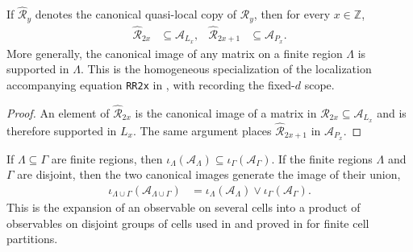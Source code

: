 \begin{lemma}
    \label{thm:qca_site_indexed_support_regions}
    \leanok
    If $\widehat{\mathcal R}_y$ denotes the canonical quasi-local copy of
    $\mathcal R_y$, then for every $x\in\mathbb Z$,
    \begin{align}
        \widehat{\mathcal R}_{2x}   & \subseteq\mathcal A_{L_x}, &
        \widehat{\mathcal R}_{2x+1} & \subseteq\mathcal A_{P_x}.
    \end{align}
    More generally, the canonical image of any matrix on a finite region
    $\Lambda$ is supported in $\Lambda$.
    This is the homogeneous specialization of the localization accompanying
    equation \texttt{RR2x} in \cite[lines~1261--1274]{Gross2012IndexTheory}, with \cite{gap:gnvw12_site_dependent_adjacent_generation_scope} recording the
    fixed-$d$
    scope.
\end{lemma}

\begin{proof}\leanok
    An element of $\widehat{\mathcal R}_{2x}$ is the canonical image of a
    matrix in $\mathcal R_{2x}\subseteq\mathcal A_{L_x}$ and is therefore
    supported in $L_x$.  The same argument places
    $\widehat{\mathcal R}_{2x+1}$ in $\mathcal A_{P_x}$.
\end{proof}

\begin{lemma}
    \label{thm:qca_disjoint_region_generation}
    \leanok
    If $\Lambda\subseteq\Gamma$ are finite regions, then
    $\iota_\Lambda(\mathcal A_\Lambda)
        \subseteq\iota_\Gamma(\mathcal A_\Gamma)$.  If the finite regions
    $\Lambda$ and $\Gamma$ are disjoint, then the two canonical images
    generate the image of their union,
    \begin{align}
        \iota_{\Lambda\cup\Gamma}(\mathcal A_{\Lambda\cup\Gamma})
         & =\iota_\Lambda(\mathcal A_\Lambda)
        \vee\iota_\Gamma(\mathcal A_\Gamma).
        \label{eq:qca_disjoint_region_generation}
    \end{align}
    This is the expansion of an observable on several cells into a product of
    observables on disjoint groups of cells used in \cite[lines~592--596]{Gross2012IndexTheory} and proved in \cite[lines~341--364]{SchumacherWerner2004QCA} for finite
    cell
    partitions.
\end{lemma}

